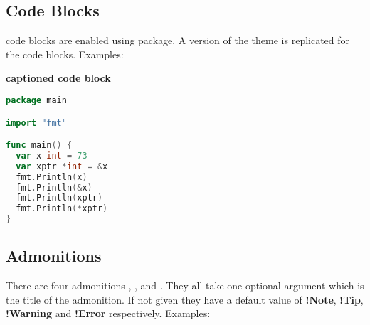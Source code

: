 \documentclass[12pt,a4paper]{report}
\begin{document}
\subsection{Code Blocks}
code blocks are enabled using  package. A version of the  theme is replicated for the code blocks. Examples:

\noindent
\textbf{captioned code block}
\begin{lstlisting}[language=go]
package main

import "fmt"

func main() {
  var x int = 73
  var xptr *int = &x
  fmt.Println(x)
  fmt.Println(&x)
  fmt.Println(xptr)
  fmt.Println(*xptr)
}
\end{lstlisting}

\subsection{Admonitions}
There are four admonitions , ,  and . They all take one optional argument which is the title of the admonition. If not given they have a default value of \textbf{!Note}, \textbf{!Tip}, \textbf{!Warning} and \textbf{!Error} respectively. Examples:\\
\end{document}
